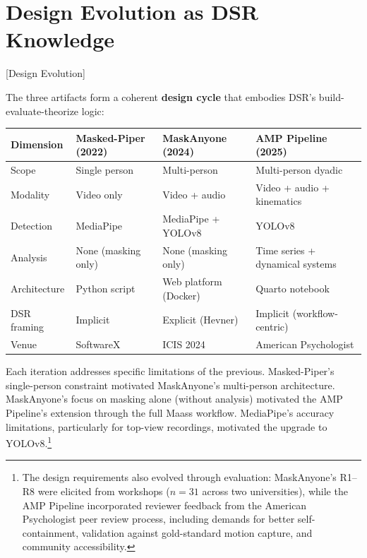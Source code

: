 \documentclass[../main.tex]{subfiles}
\begin{document}
\section{Design Evolution as DSR Knowledge}[Design Evolution]

The three artifacts form a coherent \textbf{design cycle} that embodies DSR's build-evaluate-theorize logic:

\begin{center}
\small
\begin{tabular}{lp{3cm}p{3cm}p{3.5cm}}
\toprule
\textbf{Dimension} & \textbf{Masked-Piper (2022)} & \textbf{MaskAnyone (2024)} & \textbf{AMP Pipeline (2025)} \\
\midrule
Scope & Single person & Multi-person & Multi-person dyadic \\
Modality & Video only & Video + audio & Video + audio + kinematics \\
Detection & MediaPipe & MediaPipe + YOLOv8 & YOLOv8 \\
Analysis & None (masking only) & None (masking only) & Time series + dynamical systems \\
Architecture & Python script & Web platform (Docker) & Quarto notebook \\
DSR framing & Implicit & Explicit (Hevner) & Implicit (workflow-centric) \\
Venue & SoftwareX & ICIS 2024 & American Psychologist \\
\bottomrule
\end{tabular}
\end{center}

Each iteration addresses specific limitations of the previous. Masked-Piper's single-person constraint motivated MaskAnyone's multi-person architecture. MaskAnyone's focus on masking alone (without analysis) motivated the AMP Pipeline's extension through the full Maass workflow. MediaPipe's accuracy limitations, particularly for top-view recordings, motivated the upgrade to YOLOv8.\footnote{The design requirements also evolved through evaluation: MaskAnyone's R1--R8 were elicited from workshops ($n = 31$ across two universities), while the AMP Pipeline incorporated reviewer feedback from the American Psychologist peer review process, including demands for better self-containment, validation against gold-standard motion capture, and community accessibility.}
\end{document}
